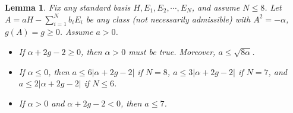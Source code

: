 \documentclass[11pt]{amsart}
\theoremstyle{plain}
\numberwithin{theorem}{section}
\newtheorem{lemma}[theorem]{Lemma}
\theoremstyle{definition}
\begin{document}
\begin{lemma}
Fix any standard basis $H,E_1,E_2,\cdots,E_N$, and assume $N\leq 8$. Let 
$A=aH-\sum_{i=1}^N b_i E_i$ be any class (not necessarily admissible) with $A^2=-\alpha$, $g(A)=g\geq 0$. Assume $a>0$. 
\begin{itemize}
\item [{(1)}] If $\alpha+2g-2\geq 0$, then $\alpha>0$ must be true. Moreover, $a\leq \sqrt{8\alpha}$. 
\item [{(2)}] If $\alpha\leq 0$, then $a\leq 6|\alpha+2g-2|$ if $N=8$, $a\leq 3|\alpha+2g-2|$ if $N=7$,
and  $a\leq 2|\alpha+2g-2|$ if $N\leq 6$.
\item [{(3)}] If $\alpha>0$ and $\alpha+2g-2<0$, then $a\leq 7$. 
\end{itemize}
\end{lemma}
\end{document}
